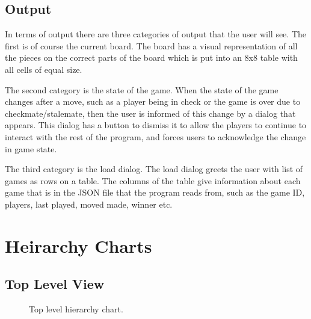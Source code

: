 \subsection{Output}
In terms of output there are three categories of output that the user will see. The first is of course the current board. The board has a visual representation of all the pieces on the correct parts of the board which is put into an 8x8 table with all cells of equal size. 

The second category is the state of the game. When the state of the game changes after a move, such as a player being in check or the game is over due to checkmate/stalemate, then the user is informed of this change by a dialog that appears. This dialog has a button to dismiss it to allow the players to continue to interact with the rest of the program, and forces users to acknowledge the change in game state.

The third category is the load dialog. The load dialog greets the user with list of games as rows on a table. The columns of the table give information about each game that is in the JSON file that the program reads from, such as the game ID, players, last played, moved made, winner etc. 
\section{Heirarchy Charts}
\subsection{Top Level View}
\begin{figure}[H]
	\centering
 	\caption{Top level hierarchy chart.}
\end{figure}
